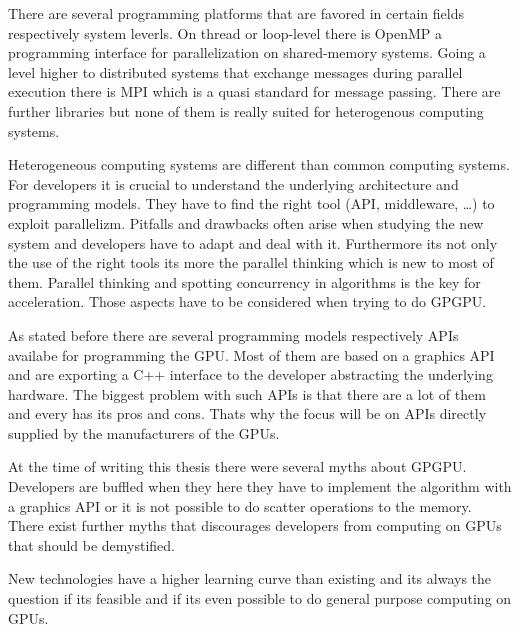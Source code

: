 
There are several programming platforms that are favored in certain fields 
respectively system leverls. On thread or loop-level there is OpenMP a programming
interface for parallelization on shared-memory systems. Going a level higher to
distributed systems that exchange messages during parallel execution there is 
\gls{MPI} which is a quasi standard for message passing. There are further 
libraries but none of them is really suited for heterogenous computing systems.

Heterogeneous computing systems are different than common computing systems. For
developers it is crucial to understand the underlying architecture and
programming models. They have to find the right tool (\gls{API}, middleware,
\ldots) to exploit parallelizm. Pitfalls and drawbacks often arise when studying
the new system and developers have to adapt and deal with it. Furthermore its
not only the use of the right tools its more the parallel thinking which is new
to most of them. Parallel thinking and spotting concurrency in algorithms is the
key for acceleration. Those aspects have to be considered when trying to do
\gls{GPGPU}.


As stated before there are several programming models respectively \glspl{API} 
availabe for programming the \gls{GPU}. Most of them are based on a graphics 
\gls{API} and are exporting a C++ interface to the developer abstracting
the underlying hardware. The biggest problem with such \glspl{API} is that 
there are a lot of them and every has its pros and cons. Thats why the focus
will be on \glspl{API} directly supplied by the manufacturers of the \glspl{GPU}.

At the time of writing this thesis there were several myths about \gls{GPGPU}.
Developers are buffled when they here they have to implement the algorithm with
a graphics \gls{API} or it is not possible to do scatter operations to the memory.
There exist further myths that discourages developers from computing on
\glspl{GPU} that should be demystified. 

New technologies have a higher learning curve than existing and its always the 
question if its feasible and if its even possible to do general purpose computing
on \glspl{GPU}. 

